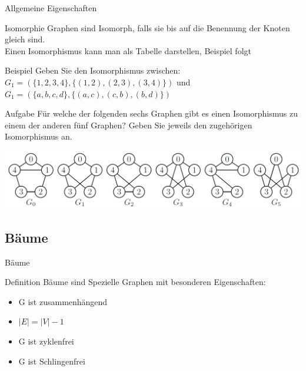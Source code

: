 	
	\begin{frame}{Allgemeine Eigenschaften}
		 \begin{block}{Isomorphie}
		 	Graphen sind Isomorph, falls sie bis auf die Benennung der Knoten gleich sind.\\
		 	\vspace{5pt}
		 	Einen Isomorphismus kann man als Tabelle darstellen, Beispiel folgt
		 \end{block}
		 
		 \begin{exampleblock}{Beispiel}
		 	Geben Sie den Isomorphismus zwischen:\\
		 		$G_1 = (\{1,2,3,4\}, \{(1,2),(2,3),(3,4)\})$ und\\
		 		$G_1 = (\{a,b,c,d\}, \{(a,c),(c,b),(b,d)\})$
		 \end{exampleblock}
	\end{frame}
	
	
	
	\begin{frame}{Aufgabe}
		Für welche der folgenden sechs Graphen gibt es einen
    	Isomorphismus zu einem der anderen fünf Graphen? Geben Sie jeweils
    	den zugehörigen Isomorphismus an.

		\begin{center}
			\includegraphics[scale=0.3]{graphics/07/isomorphie.png}
		\end{center}
   
	\end{frame}
	
	
	\subsection{Bäume}
	\begin{frame}{Bäume}
		\begin{block}{Definition}
			Bäume sind Spezielle Graphen mit besonderen Eigenschaften:\\
			\begin{itemize}
				\item G ist zusammenhängend
				\item $|E| = |V| - 1$
				\item G ist zyklenfrei
				\item G ist Schlingenfrei
			\end{itemize}
		\end{block}
	\end{frame}
	
